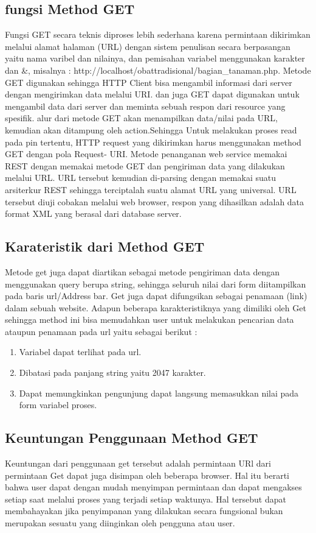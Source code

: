\subsection{fungsi Method GET}
Fungsi GET secara teknis diproses lebih sederhana karena permintaan dikirimkan melalui alamat halaman (URL) dengan sistem 
penulisan secara berpasangan yaitu nama varibel dan nilainya, dan pemisahan variabel menggunakan karakter dan &, misalnya :
http://localhost/obattradisional/bagian_tanaman.php. Metode GET digunakan sehingga HTTP Client bisa mengambil informasi dari 
server dengan mengirimkan data melalui URI.
dan juga GET dapat digunakan untuk mengambil data dari server dan meminta sebuah respon dari resource yang spesifik.  alur dari 
metode GET akan menampilkan data/nilai pada URL, kemudian akan ditampung oleh action.Sehingga Untuk melakukan proses read pada 
pin tertentu, HTTP request yang dikirimkan harus menggunakan method GET dengan pola Request- URI.
Metode penanganan web service memakai REST dengan memakai metode GET dan pengiriman data yang dilakukan melalui URL. URL 
tersebut kemudian di-parsing dengan memakai suatu arsiterkur REST sehingga terciptalah suatu alamat URL yang universal. URL 
tersebut diuji cobakan melalui web browser, respon yang dihasilkan adalah data format XML yang berasal dari database server. 


\subsection{Karateristik dari Method GET}
Metode get juga dapat diartikan sebagai metode pengiriman data dengan menggunakan query berupa string, sehingga seluruh nilai dari form 
diitampilkan pada baris url/Address bar. Get juga dapat difungsikan sebagai penamaan (link) dalam sebuah website. Adapun beberapa 
karakteristiknya yang dimiliki oleh Get sehingga method ini bisa memudahkan user untuk melakukan pencarian data ataupun penamaan pada 
url yaitu sebagai berikut :
\begin{enumerate}
\item Variabel dapat terlihat pada url.
\item Dibatasi pada panjang string yaitu 2047 karakter.
\item Dapat memungkinkan pengunjung dapat langsung memasukkan nilai pada form variabel proses.
\end{enumerate}

\subsection{Keuntungan Penggunaan Method GET}
Keuntungan dari penggunaan get tersebut adalah permintaan URl dari permintaan Get dapat juga disimpan oleh beberapa browser.
Hal itu berarti bahwa user dapat dengan mudah menyimpan permintaan dan dapat mengakses setiap saat melalui proses yang terjadi setiap 
waktunya. Hal tersebut dapat membahayakan jika penyimpanan yang dilakukan secara fungsional bukan merupakan sesuatu yang diinginkan oleh 
pengguna atau user.

